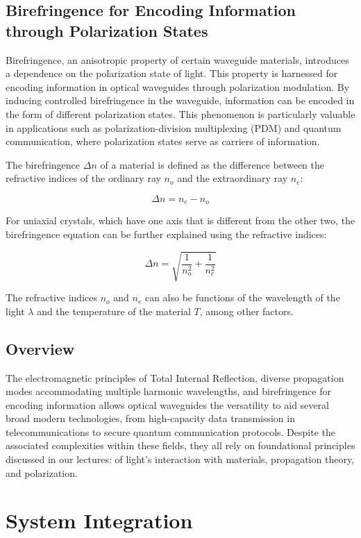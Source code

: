 \documentclass[10pt]{article}
\begin{document}
\subsection{Birefringence for Encoding Information through Polarization States}

Birefringence, an anisotropic property of certain waveguide materials, introduces a dependence on the polarization state of light. This property is harnessed for encoding information in optical waveguides through polarization modulation.
By inducing controlled birefringence in the waveguide, information can be encoded in the form of different polarization states. This phenomenon is particularly valuable in applications such as polarization-division multiplexing (PDM) and quantum communication, where polarization states serve as carriers of information.

The birefringence \(\Delta n\) of a material is defined as the difference between the refractive indices of the ordinary ray \(n_o\) and the extraordinary ray \(n_e\):

\[
\Delta n = n_e - n_o
\]

For uniaxial crystals, which have one axis that is different from the other two, the birefringence equation can be further explained using the refractive indices:

\[
\Delta n = \sqrt{\frac{1}{n_o^2} + \frac{1}{n_e^2}}
\]

The refractive indices \(n_o\) and \(n_e\) can also be functions of the wavelength of the light \(\lambda\) and the temperature of the material \(T\), among other factors.


\subsection{Overview}
The electromagnetic principles of Total Internal Reflection, diverse propagation modes accommodating multiple harmonic wavelengths, 
and birefringence for encoding information allows optical waveguides the versatility to aid several broad modern technologies, 
from high-capacity data transmission in telecommunications to secure quantum communication protocols. Despite the associated complexities within these fields, 
they all rely on foundational principles discussed in our lectures: of light's interaction with materials, propagation theory, and polarization.


\section{System Integration}
\end{document}
